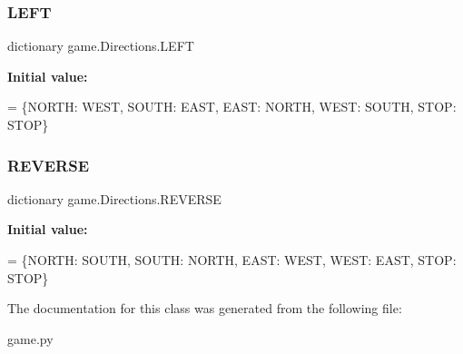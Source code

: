 \subsubsection{\texorpdfstring{L\+E\+FT}{LEFT}}
{\footnotesize\ttfamily dictionary game.\+Directions.\+L\+E\+FT\hspace{0.3cm}{\ttfamily [static]}}

{\bfseries Initial value\+:}
\begin{DoxyCode}
=        \{NORTH: WEST,
                 SOUTH: EAST,
                 EAST:  NORTH,
                 WEST:  SOUTH,
                 STOP:  STOP\}
\end{DoxyCode}
\mbox{\label{classgame_1_1_directions_ad48d0bb573f126a729c998b505812807}} 
\subsubsection{\texorpdfstring{R\+E\+V\+E\+R\+SE}{REVERSE}}
{\footnotesize\ttfamily dictionary game.\+Directions.\+R\+E\+V\+E\+R\+SE\hspace{0.3cm}{\ttfamily [static]}}

{\bfseries Initial value\+:}
\begin{DoxyCode}
=  \{NORTH: SOUTH,
             SOUTH: NORTH,
             EAST: WEST,
             WEST: EAST,
             STOP: STOP\}
\end{DoxyCode}


The documentation for this class was generated from the following file\+:\begin{DoxyCompactItemize}
\item 
game.\+py\end{DoxyCompactItemize}
